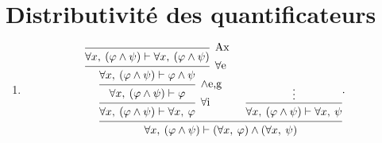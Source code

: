 \section{Distributivité des quantificateurs}

\begin{enumerate}
	\item
		\[
			\begin{prooftree}
				\infer 0[Ax]{\forall x,\:(\varphi \land \psi) \vdash\forall x,\:(\varphi \land \psi)}
				\infer 1[$\forall$e]{\forall x,\:(\varphi \land \psi) \vdash\varphi \land \psi}
				\infer 1[$\land$e,g]{\forall x,\:(\varphi \land \psi) \vdash\varphi}
				\infer 1[$\forall$i]{\forall x,\:(\varphi \land \psi) \vdash \forall x,\: \varphi}
				\hypo{\vdots}
				\infer 1{\forall x,\:(\varphi \land \psi) \vdash \forall x,\: \psi}
				\infer 2{\forall x,\:(\varphi \land \psi) \vdash (\forall x,\: \varphi) \land (\forall x,\: \psi)}
			\end{prooftree}
		.\] 
\end{enumerate}
